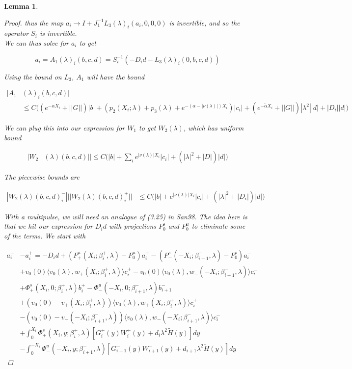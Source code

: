 \documentclass[12pt]{article}
\newtheorem{lemma}{Lemma}
\begin{document}
\begin{lemma}
\begin{proof}
thus the map $a_i \rightarrow I + J_1^{-1} L_3(\lambda)_i(a_i, 0, 0, 0)$ is invertible, and so the operator $S_i$ is invertible.\\

We can thus solve for $a_i$ to get

\[
a_i = A_1(\lambda)_i(b, c, d) = S_i^{-1}(-D_i d - L_3(\lambda)_i(0, b, c, d))
\]

Using the bound on $L_3$, $A_1$ will have the bound

\begin{align*}
|A_1&(\lambda)_i(b, c, d)| \\
&\leq C \Big( (e^{-\alpha X_i} + ||G||) |b| + ( p_2(X_i; \lambda) + p_3(\lambda) + e^{-(\alpha - |\nu(\lambda)|)X_i} )|c_i|
+ (e^{-\tilde{\alpha} X_i} + ||G||) |\lambda^2| |d| + |D_i||d| \Big)
\end{align*} 

We can plug this into our expression for $W_1$ to get $W_2(\lambda)$, which has uniform bound

\begin{align*}
|W_2&(\lambda)(b,c,d)|| 
\leq C \Big( |b| + \sum_i e^{|\nu(\lambda)|X_i}|c_i| + (|\lambda|^2 + |D|)|d| \Big)
\end{align*}

The piecewise bounds are

\begin{align*}
|W_2(\lambda)(b,c,d)_i^-|| 
|W_2(\lambda)(b,c,d)_i^+|| 
&\leq C \Big( |b| + e^{|\nu(\lambda)|X_i}|c_i| + (|\lambda|^2 + |D_i|)|d| \Big)
\end{align*}

With a multipulse, we will need an analogue of (3.25) in San98. The idea here is that we hit our expression for $D_i d$ with projections $P^s_0$ and $P^u_0$ to eliminate some of the terms. We start with

\begin{align*}
a_i^- &- a_i^+ = -D_i d + (P^u_+(X_i; \beta_i^+, \lambda) - P_0^u)a_i^+ - (P^s_-(-X_i; \beta_{i+1}^-, \lambda) - P_0^s)a_i^- \\
&+ v_0(0) \langle v_0(\lambda), w_+(X_i; \beta_i^+, \lambda) \rangle c_i^+ 
- v_0(0) \langle v_0(\lambda), w_-(-X_i; \beta_{i+1}^-, \lambda) \rangle c_i^- \\
&+ \Phi^s_+(X_i, 0; \beta_i^+, \lambda)b_i^+ - \Phi^u_-(-X_i, 0; \beta_{i+1}^-, \lambda)b_{i+1}^- \\
&+ (v_0(0) - v_+(X_i; \beta_i^+, \lambda)) \langle v_0(\lambda), w_+(X_i; \beta_i^+, \lambda) \rangle c_i^+ \\
&- (v_0(0) - v_-(-X_i; \beta_{i+1}^-, \lambda)) \langle v_0(\lambda), w_-(-X_i; \beta_{i+1}^-, \lambda) \rangle c_i^- \\
&+ \int_0^{X_i} \Phi^s_+(X_i, y; \beta_i^+, \lambda) [ G_i^+(y) W_i^+(y) + d_i \lambda^2 \tilde{H}(y) ] dy \\
&- \int_0^{-X_i} \Phi^u_-(-X_i, y; \beta_{i+1}^-, \lambda) [ G_{i+1}^-(y) W_{i+1}^-(y) + d_{i+1} \lambda^2 \tilde{H}(y) ] dy 
\end{align*}


\end{proof}
\end{lemma}
\end{document}
